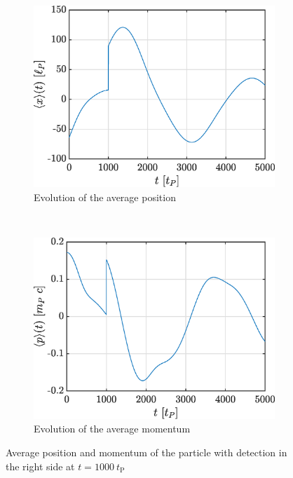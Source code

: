 \documentclass[a4paper,12pt,twoside]{article}
\begin{document}
\begin{figure}[h]
        \centering
        \begin{subfigure}[t]{0.45\textwidth}
          \includegraphics[width=\textwidth]{graphs/iv_det_xmoy.eps}
          \caption{Evolution of the average position}
          \label{fig:iv_det_xmoy}
        \end{subfigure}
        ~
        \begin{subfigure}[t]{0.45\textwidth}
          \includegraphics[width=\textwidth]{graphs/iv_det_pmoy.eps}
          \caption{Evolution of the average momentum}
          \label{fig:iv_det_pmoy}
        \end{subfigure}
        \caption{Average position and momentum of the particle with detection in the right side at $t=1000~t_\text{P}$}
        \label{fig:iv_det_xp}
\end{figure}
\end{document}

